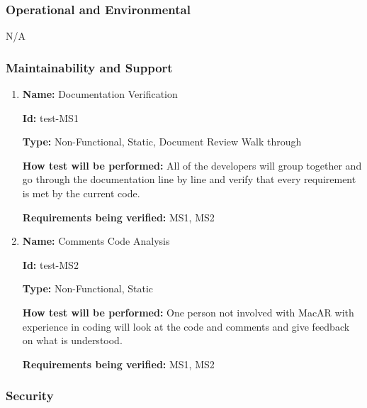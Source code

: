 \documentclass[12pt, titlepage]{article}
\begin{document}
\subsubsection{Operational and Environmental}

N/A

\subsubsection{Maintainability and Support}

\begin{enumerate}

\item{\textbf{Name:} Documentation Verification}

\textbf{Id:} test-MS1

\textbf{Type:} Non-Functional, Static, Document Review Walk through
			
\textbf{How test will be performed:} All of the developers will group together and go through the documentation line by line and verify that every requirement is met by the current code.

\textbf{Requirements being verified:} MS1, MS2

\item{\textbf{Name:} Comments Code Analysis}

\textbf{Id:} test-MS2

\textbf{Type:} Non-Functional, Static
					
\textbf{How test will be performed:} One person not involved with MacAR with experience in coding will look at the code and comments and give feedback on what is understood.

\textbf{Requirements being verified:} MS1, MS2

\end{enumerate}

\subsubsection{Security}
\end{document}
